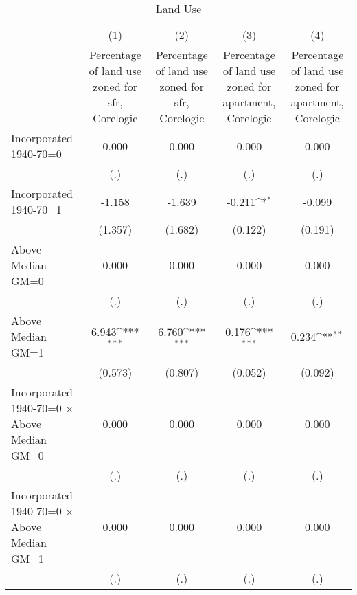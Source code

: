 \begin{table}[htbp]\centering
\def\sym#1{\ifmmode^{#1}\else\(^{#1}\)\fi}
\caption{Land Use}
\begin{tabular}{l*{4}{c}}
\hline\hline
                    &\multicolumn{1}{c}{(1)}&\multicolumn{1}{c}{(2)}&\multicolumn{1}{c}{(3)}&\multicolumn{1}{c}{(4)}\\
                    &\multicolumn{1}{c}{Percentage of land use zoned for sfr, Corelogic}&\multicolumn{1}{c}{Percentage of land use zoned for sfr, Corelogic}&\multicolumn{1}{c}{Percentage of land use zoned for apartment, Corelogic}&\multicolumn{1}{c}{Percentage of land use zoned for apartment, Corelogic}\\
\hline
Incorporated 1940-70=0&       0.000         &       0.000         &       0.000         &       0.000         \\
                    &         (.)         &         (.)         &         (.)         &         (.)         \\
[1em]
Incorporated 1940-70=1&      -1.158         &      -1.639         &      -0.211\sym{*}  &      -0.099         \\
                    &     (1.357)         &     (1.682)         &     (0.122)         &     (0.191)         \\
[1em]
Above Median GM=0   &       0.000         &       0.000         &       0.000         &       0.000         \\
                    &         (.)         &         (.)         &         (.)         &         (.)         \\
[1em]
Above Median GM=1   &       6.943\sym{***}&       6.760\sym{***}&       0.176\sym{***}&       0.234\sym{**} \\
                    &     (0.573)         &     (0.807)         &     (0.052)         &     (0.092)         \\
[1em]
Incorporated 1940-70=0 $\times$ Above Median GM=0&       0.000         &       0.000         &       0.000         &       0.000         \\
                    &         (.)         &         (.)         &         (.)         &         (.)         \\
[1em]
Incorporated 1940-70=0 $\times$ Above Median GM=1&       0.000         &       0.000         &       0.000         &       0.000         \\
                    &         (.)         &         (.)         &         (.)         &         (.)         \\

\end{tabular}
\end{table}
